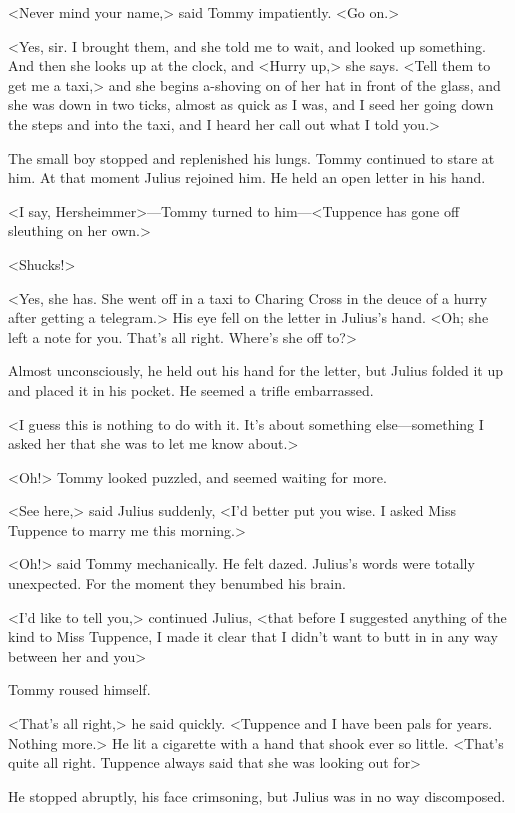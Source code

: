 <Never mind your name,> said Tommy impatiently. <Go on.>

<Yes, sir. I brought them, and she told me to wait, and looked up something. And then she looks up at the clock, and <Hurry up,> she says. <Tell them to get me a taxi,> and she begins a-shoving on of her hat in front of the glass, and she was down in two ticks, almost as quick as I was, and I seed her going down the steps and into the taxi, and I heard her call out what I told you.>

The small boy stopped and replenished his lungs. Tommy continued to stare at him. At that moment Julius rejoined him. He held an open letter in his hand.

<I say, Hersheimmer>—Tommy turned to him—<Tuppence has gone off sleuthing on her own.>

<Shucks!>

<Yes, she has. She went off in a taxi to Charing Cross in the deuce of a hurry after getting a telegram.> His eye fell on the letter in Julius's hand. <Oh; she left a note for you. That's all right. Where's she off to?>

Almost unconsciously, he held out his hand for the letter, but Julius folded it up and placed it in his pocket. He seemed a trifle embarrassed.

<I guess this is nothing to do with it. It's about something else—something I asked her that she was to let me know about.>

<Oh!> Tommy looked puzzled, and seemed waiting for more.

<See here,> said Julius suddenly, <I'd better put you wise. I asked Miss Tuppence to marry me this morning.>

<Oh!> said Tommy mechanically. He felt dazed. Julius's words were totally unexpected. For the moment they benumbed his brain.

<I'd like to tell you,> continued Julius, <that before I suggested anything of the kind to Miss Tuppence, I made it clear that I didn't want to butt in in any way between her and you\longdash>

Tommy roused himself.

<That's all right,> he said quickly. <Tuppence and I have been pals for years. Nothing more.> He lit a cigarette with a hand that shook ever so little. <That's quite all right. Tuppence always said that she was looking out for\longdash>

He stopped abruptly, his face crimsoning, but Julius was in no way discomposed.

